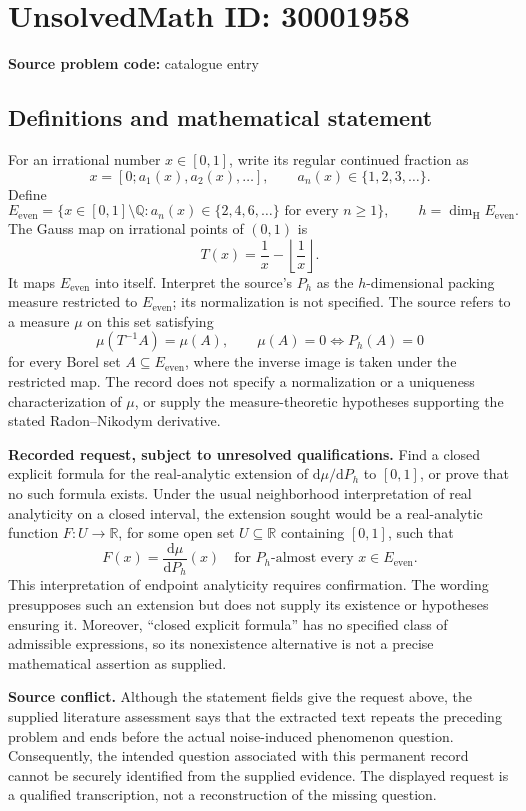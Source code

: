 \documentclass[11pt]{article}
\newcommand{\Q}{\mathbb{Q}}
\newcommand{\R}{\mathbb{R}}
\begin{document}
\section*{UnsolvedMath ID: 30001958}
\textbf{Source problem code:} catalogue entry
\subsection{Definitions and mathematical statement}
For an irrational number \(x\in[0,1]\), write its regular continued fraction as
\[
x=[0;a_1(x),a_2(x),\ldots],\qquad a_n(x)\in\{1,2,3,\ldots\}.
\]
Define
\[
E_{\mathrm{even}}=\{x\in[0,1]\setminus\Q: a_n(x)\in\{2,4,6,\ldots\}\text{ for every }n\geq1\},
\qquad h=\dim_{\mathrm H}E_{\mathrm{even}}.
\]
The Gauss map on irrational points of \((0,1)\) is
\[
T(x)=\frac1x-\left\lfloor\frac1x\right\rfloor.
\]
It maps \(E_{\mathrm{even}}\) into itself. Interpret the source's \(P_h\) as the \(h\)-dimensional packing measure restricted to \(E_{\mathrm{even}}\); its normalization is not specified. The source refers to a measure \(\mu\) on this set satisfying
\[
\mu(T^{-1}A)=\mu(A),\qquad
\mu(A)=0\Longleftrightarrow P_h(A)=0
\]
for every Borel set \(A\subseteq E_{\mathrm{even}}\), where the inverse image is taken under the restricted map. The record does not specify a normalization or a uniqueness characterization of \(\mu\), or supply the measure-theoretic hypotheses supporting the stated Radon--Nikodym derivative.

\textbf{Recorded request, subject to unresolved qualifications.} Find a closed explicit formula for the real-analytic extension of \(\mathrm d\mu/\mathrm dP_h\) to \([0,1]\), or prove that no such formula exists. Under the usual neighborhood interpretation of real analyticity on a closed interval, the extension sought would be a real-analytic function \(F:U\to\R\), for some open set \(U\subseteq\R\) containing \([0,1]\), such that
\[
F(x)=\frac{\mathrm d\mu}{\mathrm dP_h}(x)
\quad\text{for }P_h\text{-almost every }x\in E_{\mathrm{even}}.
\]
This interpretation of endpoint analyticity requires confirmation. The wording presupposes such an extension but does not supply its existence or hypotheses ensuring it. Moreover, ``closed explicit formula'' has no specified class of admissible expressions, so its nonexistence alternative is not a precise mathematical assertion as supplied.

\textbf{Source conflict.} Although the statement fields give the request above, the supplied literature assessment says that the extracted text repeats the preceding problem and ends before the actual noise-induced phenomenon question. Consequently, the intended question associated with this permanent record cannot be securely identified from the supplied evidence. The displayed request is a qualified transcription, not a reconstruction of the missing question.
\end{document}
